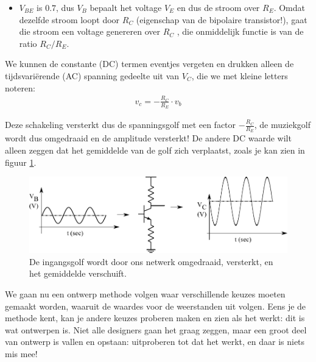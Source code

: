 \documentclass{article}
\begin{document}
				\begin{itemize}
					\item $V_{BE}$ is $0.7$, dus $V_B$ bepaalt het voltage $V_E$ en dus de stroom over $R_E$. Omdat dezelfde stroom loopt door $R_C$ (eigenschap van de bipolaire transistor!), gaat die stroom een  voltage genereren over $R_C$ , die onmiddelijk functie is van de ratio $R_C/R_E$.
				\end{itemize}

				We kunnen de constante (DC) termen eventjes vergeten en drukken alleen de tijdsvari\"erende (AC) spanning gedeelte uit van $V_C$, die we met kleine letters noteren:
				\begin{align}
				    v_c = - \frac{R_C}{R_E} \cdot v_b
				\end{align}

				Deze schakeling versterkt dus de spanningsgolf met een factor $- \frac{R_C}{R_E}$, de muziekgolf wordt dus omgedraaid en de amplitude versterkt! De andere DC waarde wilt alleen zeggen dat het gemiddelde van de golf zich verplaatst, zoals je kan zien in figuur \ref{fig:golven}.

				\begin{figure}[htbp]
					\centering
					\includegraphics[width=\linewidth]{golven}
					\caption{De ingangsgolf wordt door ons netwerk omgedraaid, versterkt, en het gemiddelde verschuift.}
					\label{fig:golven}
				\end{figure}

				We gaan nu een ontwerp methode volgen waar verschillende keuzes moeten gemaakt worden, waaruit de waardes voor de weerstanden uit volgen. Eens je de methode kent, kan je andere keuzes proberen maken en zien als het werkt: dit is wat ontwerpen is. Niet alle designers gaan het graag zeggen, maar een groot deel van ontwerp is vallen en opstaan: uitproberen tot dat het werkt, en daar is niets mis mee!
\end{document}
